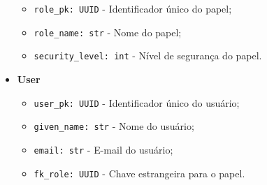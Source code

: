 \begin{itemize}
\begin{itemize}
          \item \texttt{role\_pk: UUID} - Identificador único do papel;
          \item \texttt{role\_name: str} - Nome do papel;
          \item \texttt{security\_level: int} - Nível de segurança do papel.
      \end{itemize}
    \item \textbf{User}  
      \begin{itemize}
          \item \texttt{user\_pk: UUID} - Identificador único do usuário;
          \item \texttt{given\_name: str} - Nome do usuário;
          \item \texttt{email: str} - E-mail do usuário;
          \item \texttt{fk\_role: UUID} - Chave estrangeira para o papel.
      \end{itemize}
\end{itemize}